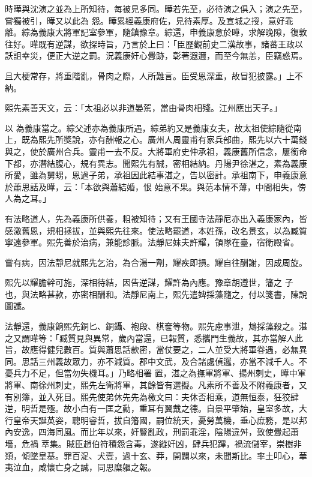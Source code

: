 \begin{pinyinscope}
 時曄與沈演之並為上所知待，每被見多同。曄若先至，必待演之俱入；演之先至，嘗獨被引，曄又以此為
 怨。曄累經義康府佐，見待素厚。及宣城之授，意好乖離。綜為義康大將軍記室參軍，隨鎮豫章。綜還，申義康意於曄，求解晚隙，復敦往好。曄既有逆謀，欲探時旨，乃言於上曰：「臣歷觀前史二漢故事，諸蕃王政以訞詛幸災，便正大逆之罰。況義康奸心釁跡，彰著遐邇，而至今無恙，臣竊惑焉。



 且大梗常存，將重階亂，骨肉之際，人所難言。臣受恩深重，故冒犯披露。」上不納。



 熙先素善天文，云：「太祖必以非道晏駕，當由骨肉相殘。江州應出天子。」



 以
 為義康當之。綜父述亦為義康所遇，綜弟約又是義康女夫，故太祖使綜隨從南上，既為熙先所獎說，亦有酬報之心。廣州人周靈甫有家兵部曲，熙先以六十萬錢與之，使於廣州合兵。靈甫一去不反。大將軍府史仲承祖，義康舊所信念，屢銜命下都，亦潛結腹心，規有異志。聞熙先有誠，密相結納。丹陽尹徐湛之，素為義康所愛，雖為舅甥，恩過子弟，承祖因此結事湛之，告以密計。承祖南下，申義康意於蕭思話及曄，云：「本欲與蕭結婚，恨
 始意不果。與范本情不薄，中間相失，傍人為之耳。」



 有法略道人，先為義康所供養，粗被知待；又有王國寺法靜尼亦出入義康家內，皆感激舊恩，規相拯拔，並與熙先往來。使法略罷道，本姓孫，改名景玄，以為臧質寧遠參軍。熙先善於治病，兼能診脈。法靜尼妹夫許耀，領隊在臺，宿衛殿省。



 嘗有病，因法靜尼就熙先乞治，為合湯一劑，耀疾即損。耀自往酬謝，因成周旋。



 熙先以耀膽幹可施，深相待結，因告逆謀，耀許為內應。豫章胡遵世，籓之
 子也，與法略甚款，亦密相酬和。法靜尼南上，熙先遣婢採藻隨之，付以箋書，陳說圖讖。



 法靜還，義康餉熙先銅匕、銅鑷、袍段、棋奩等物。熙先慮事泄，鴆採藻殺之。湛之又謂曄等：「臧質見與異常，歲內當還，已報質，悉攜門生義故，其亦當解人此旨，故應得健兒數百。質與蕭思話款密，當仗要之，二人並受大將軍眷遇，必無異同。思話三州義故眾力，亦不減質。郡中文武，及合諸處偵邏，亦當不減千人。不憂兵力不足，但當勿失機耳。」乃略相署
 置，湛之為撫軍將軍、揚州刺史，曄中軍將軍、南徐州刺史，熙先左衛將軍，其餘皆有選擬。凡素所不善及不附義康者，又有別簿，並入死目。熙先使弟休先先為檄文曰：夫休否相乘，道無恒泰，狂狡肆逆，明哲是殛。故小白有一匡之勳，重耳有翼戴之德。自景平肇始，皇室多故，大行皇帝天誕英姿，聰明睿哲，拔自籓國，嗣位統天，憂勞萬機，垂心庶務，是以邦內安逸，四海同風。而比年以來，奸豎亂政，刑罰乖淫，陰陽違舛，致使釁起蕭墻，危禍
 萃集。賊臣趙伯符積怨含毒，遂縱奸凶，肆兵犯蹕，禍流儲宰，崇樹非類，傾墜皇基。罪百浞、犬壹，過十玄、莽，開闢以來，未聞斯比。率土叩心，華夷泣血，咸懷亡身之誠，同思糜軀之報。




\end{pinyinscope}

